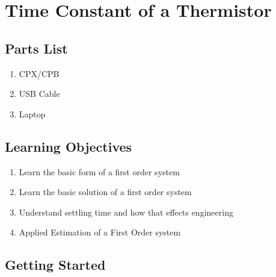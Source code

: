 \newpage

\section{Time Constant of a Thermistor}
\label{s:time_constant}

\subsection{Parts List}

\begin{enumerate}[itemsep=-5pt]
\item CPX/CPB
\item USB Cable
\item Laptop
\end{enumerate}

\subsection{Learning Objectives}
\begin{enumerate}[itemsep=-5pt]
\item Learn the basic form of a first order system
\item Learn the basic solution of a first order system
\item Understand settling time and how that effects engineering
\item Applied Estimation of a First Order system
\end{enumerate}

\subsection{Getting Started}

